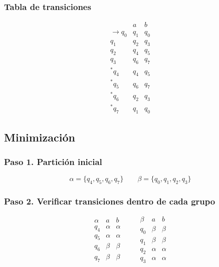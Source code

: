 \documentclass[12pt,letterpaper]{article}
\begin{document}
\begin{enumerate}[label=\arabic*.]
\begin{enumerate}
  \subsubsection*{Tabla de transiciones}
    \[
    \begin{array}{c|cc}
      & a & b \\ \hline
      \rightarrow q_0 & q_1 & q_0 \\
      q_1 & q_2 & q_3 \\
      q_2 & q_4 & q_5 \\
      q_3 & q_6 & q_7 \\
      {}^*q_4 & q_4 & q_5 \\
      {}^*q_5 & q_6 & q_7 \\
      {}^*q_6 & q_2 & q_3 \\
      {}^*q_7 & q_1 & q_0
    \end{array}
    \]

    \medskip
    
    \subsection*{Minimización}

    \subsubsection*{Paso 1. Partición inicial}
    \[
    \alpha = \{q_4,q_5,q_6,q_7\} \qquad \beta = \{q_0,q_1,q_2,q_3\}
    \]

    \subsubsection*{Paso 2. Verificar transiciones dentro de cada grupo}
    \[
    \begin{array}{c|cc}
      \alpha & a & b \\ \hline
      q_4 & \alpha & \alpha \\
      q_5 & \alpha & \alpha \\
      q_6 & \beta & \beta \\
      q_7 & \beta & \beta
    \end{array}
    \qquad
    \begin{array}{c|cc}
      \beta & a & b \\ \hline
      q_0 & \beta & \beta \\
      q_1 & \beta & \beta \\
      q_2 & \alpha & \alpha \\
      q_3 & \alpha & \alpha
    \end{array}
    \]


\end{enumerate}
\end{enumerate}
\end{document}

